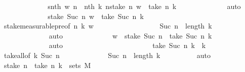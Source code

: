 \begin{isabellebody}
\ \ \ \ \ \ \ \ \ \ \isamarkupfalse%
\ \isamarkupfalse%
\ {\isachardoublequoteopen}snth\ w\ n\ {\isacharequal}{\kern0pt}\ nth\ k\ n{\isachardoublequoteclose}{\isachardoublequoteopen}stake\ n\ w\ {\isacharequal}{\kern0pt}\ take\ n\ k{\isachardoublequoteclose}\isanewline
\ \ \ \ \ \ \ \ \ \ \ \ \isamarkupfalse%
\ auto\isanewline
\ \ \ \ \ \ \ \ \ \ \isamarkupfalse%
\ \isamarkupfalse%
\ {\isachardoublequoteopen}stake\ {\isacharparenleft}{\kern0pt}Suc\ n{\isacharparenright}{\kern0pt}\ w\ {\isacharequal}{\kern0pt}\ take\ {\isacharparenleft}{\kern0pt}Suc\ n{\isacharparenright}{\kern0pt}\ k{\isachardoublequoteclose}\isanewline
\ \ \ \ \ \ \ \ \ \ \ \ \isamarkupfalse%
\ stake{\isacharunderscore}{\kern0pt}measurable{\isacharunderscore}{\kern0pt}pre{}{\isacharbrackleft}{\kern0pt}of\ n\ k\ w{\isacharbrackright}{\kern0pt}\isanewline
\ \ \ \ \ \ \ \ \ \ \ \ \ \ \ \ \ \ {\isacartoucheopen}Suc\ n\ {\isasymle}\ length\ k{\isacartoucheclose}\isanewline
\ \ \ \ \ \ \ \ \ \ \ \ \isamarkupfalse%
\ auto\isanewline
\ \ \ \ \ \ \ \ \ \ \isamarkupfalse%
\ \isamarkupfalse%
\ {\isachardoublequoteopen}w\ {\isasymin}\ stake\ {\isacharparenleft}{\kern0pt}Suc\ n{\isacharparenright}{\kern0pt}\ {\isacharminus}{\kern0pt}{\isacharbackquote}{\kern0pt}\ {\isacharbraceleft}{\kern0pt}take\ {\isacharparenleft}{\kern0pt}Suc\ n{\isacharparenright}{\kern0pt}\ k{\isacharbraceright}{\kern0pt}{\isachardoublequoteclose}\isanewline
\ \ \ \ \ \ \ \ \ \ \ \ \isamarkupfalse%
\ auto\isanewline
\ \ \ \ \ \ \ \ \isamarkupfalse%
\isanewline
\ \ \ \ \ \ \isamarkupfalse%
\isanewline
\ \ \ \ \ \ \isamarkupfalse%
\ \isamarkupfalse%
\ {\isachardoublequoteopen}take\ {\isacharparenleft}{\kern0pt}Suc\ n{\isacharparenright}{\kern0pt}\ k\ {\isacharequal}{\kern0pt}\ k{\isachardoublequoteclose}\isanewline
\ \ \ \ \ \ \ \ \isamarkupfalse%
\ take{\isacharunderscore}{\kern0pt}all{\isacharbrackleft}{\kern0pt}of\ k\ {\isachardoublequoteopen}Suc\ n{\isachardoublequoteclose}{\isacharbrackright}{\kern0pt}\isanewline
\ \ \ \ \ \ \ \ \ \ \ \ \ {\isacartoucheopen}Suc\ n\ {\isacharequal}{\kern0pt}\ length\ k{\isacartoucheclose}\isanewline
\ \ \ \ \ \ \ \ \isamarkupfalse%
\ auto\isanewline
\ \ \ \ \ \ \isamarkupfalse%
\ \isamarkupfalse%
\ {\isachardoublequoteopen}stake\ n\ {\isacharminus}{\kern0pt}{\isacharbackquote}{\kern0pt}\ {\isacharbraceleft}{\kern0pt}take\ n\ k{\isacharbraceright}{\kern0pt}\ {\isasymin}\ sets\ M{\isachardoublequoteclose}\isanewline

\end{isabellebody}
